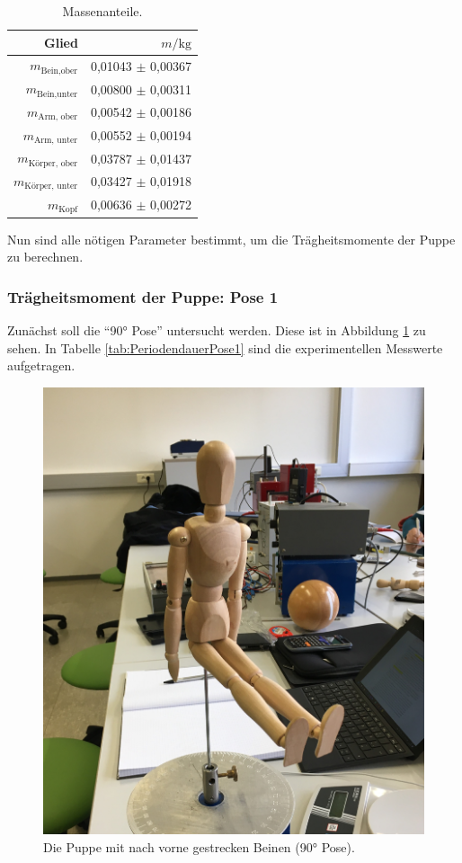 \begin{table}
  \centering
  \caption{Massenanteile.}
  \label{tab:Massenanteile}
  \begin{tabular}{rr}
  \toprule
  Glied & $m / \unit{\kilo\gram}$ \\
  \midrule
  $m_{\text{Bein,ober}}$      & 0,01043 $\pm$ 0,00367 \\
  $m_{\text{Bein,unter}}$     & 0,00800 $\pm$ 0,00311 \\
  $m_{\text{Arm, ober}}$      & 0,00542 $\pm$ 0,00186 \\
  $m_{\text{Arm, unter}}$     & 0,00552 $\pm$ 0,00194 \\
  $m_{\text{Körper, ober}}$   & 0,03787 $\pm$ 0,01437 \\
  $m_{\text{Körper, unter}}$  & 0,03427 $\pm$ 0,01918 \\
  $m_{\text{Kopf}}$           & 0,00636 $\pm$ 0,00272 \\
  \bottomrule
\end{tabular}
\end{table}


Nun sind alle nötigen Parameter bestimmt, um die Trägheitsmomente der Puppe zu berechnen.

\subsubsection{Trägheitsmoment der Puppe: Pose 1}
Zunächst soll die \enquote{90° Pose} untersucht werden.
Diese ist in Abbildung \ref{fig:pose1} zu sehen.
In Tabelle \ref{tab:PeriodendauerPose1} sind die experimentellen Messwerte aufgetragen.


\begin{figure}[H]
  \centering
  \includegraphics[width=0.3\columnwidth]{pictures/puppe_rechter_winkel.jpg}
  \caption{Die Puppe mit nach vorne gestrecken Beinen (90° Pose).}
  \label{fig:pose1}
\end{figure}

